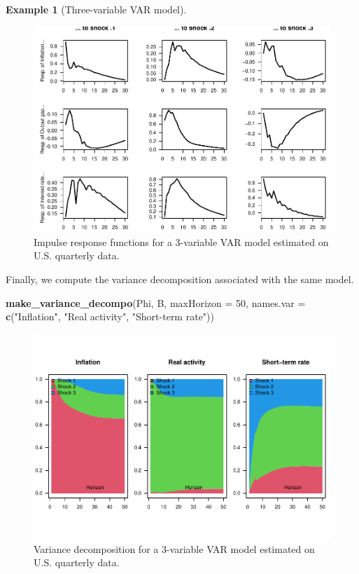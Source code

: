 \documentclass[
  12pt,
]{book}
\newenvironment{Shaded}{\begin{snugshade}}{\end{snugshade}}
\newcommand{\AttributeTok}[1]{\textcolor[rgb]{0.13,0.29,0.53}{#1}}
\newcommand{\DecValTok}[1]{\textcolor[rgb]{0.00,0.00,0.81}{#1}}
\newcommand{\FunctionTok}[1]{\textcolor[rgb]{0.13,0.29,0.53}{\textbf{#1}}}
\newcommand{\NormalTok}[1]{#1}
\newcommand{\StringTok}[1]{\textcolor[rgb]{0.31,0.60,0.02}{#1}}
\theoremstyle{definition}
\theoremstyle{definition}
\newtheorem{example}{Example}[chapter]
\theoremstyle{definition}
\theoremstyle{definition}
\theoremstyle{remark}
\begin{document}
\begin{example}[Three-variable VAR model]
\begin{figure}
\includegraphics[width=0.95\linewidth]{IdentifStructShocks_files/figure-latex/US3varIRFs1-1} \caption{Impulse response functions for a 3-variable VAR model estimated on U.S. quarterly data.}\label{fig:US3varIRFs1}
\end{figure}

Finally, we compute the variance decomposition associated with the same model.

\begin{Shaded}
\begin{Highlighting}[]
\FunctionTok{make\_variance\_decompo}\NormalTok{(Phi, B, }\AttributeTok{maxHorizon =} \DecValTok{50}\NormalTok{,}
                      \AttributeTok{names.var =} \FunctionTok{c}\NormalTok{(}\StringTok{"Inflation"}\NormalTok{, }\StringTok{"Real activity"}\NormalTok{,}
                                    \StringTok{"Short{-}term rate"}\NormalTok{))}
\end{Highlighting}
\end{Shaded}

\begin{figure}
\includegraphics[width=0.95\linewidth]{IdentifStructShocks_files/figure-latex/US3varVARdecomp-1} \caption{Variance decomposition for a 3-variable VAR model estimated on U.S. quarterly data.}\label{fig:US3varVARdecomp}
\end{figure}

\end{example}
\end{document}
